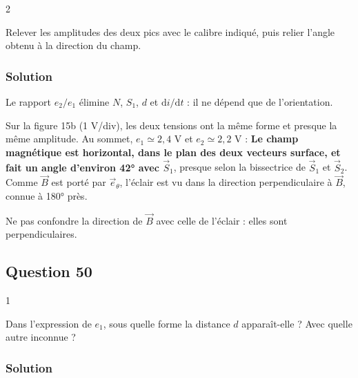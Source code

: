 \documentclass[11pt,a4paper]{article}
\newcommand{\equationajustee}[1]{%
  \sbox{\boiteequation}{$\displaystyle #1$}%
  \ifdim\wd\boiteequation>\linewidth
    \[\resizebox{\linewidth}{!}{\usebox{\boiteequation}}\]%
  \else
    \[#1\]%
  \fi}
\begin{document}
\begin{indication}{2}

Relever les amplitudes des deux pics avec le calibre indiqué, puis relier l'angle obtenu à la direction du champ.

\end{indication}

\hypertarget{solution-48}{%
\subsubsection{Solution}\label{solution-48}}

Le rapport \(e_2/e_1\) élimine \(N\), \(S_1\), \(d\) et \(\mathrm di/\mathrm dt\) : il ne dépend que de l'orientation.

Sur la figure 15b (1 V/div), les deux tensions ont la même forme et presque la même amplitude. Au sommet, \(e_1\simeq2{,}4\) V et \(e_2\simeq2{,}2\) V :
\equationajustee{\tan\alpha=\frac{e_2}{e_1}\simeq0{,}9}
\equationajustee{\boxed{\alpha\simeq42^\circ\ (\text{environ}\ 45^\circ)}}
\textbf{Le champ magnétique est horizontal, dans le plan des deux vecteurs surface, et fait un angle d'environ 42° avec \(\vec S_1\)}, presque selon la bissectrice de \(\vec S_1\) et \(\vec S_2\). Comme \(\vec B\) est porté par \(\vec e_\theta\), l'éclair est vu dans la direction perpendiculaire à \(\vec B\), connue à 180° près.

\begin{piege}

Ne pas confondre la direction de \(\vec B\) avec celle de l'éclair : elles sont perpendiculaires.

\end{piege}

\hypertarget{question-50}{%
\subsection{Question 50}\label{question-50}}

\begin{indication}{1}

Dans l'expression de \(e_1\), sous quelle forme la distance \(d\) apparaît-elle ? Avec quelle autre inconnue ?

\end{indication}

\hypertarget{solution-49}{%
\subsubsection{Solution}\label{solution-49}}
\end{document}
